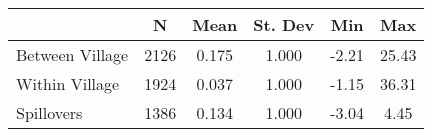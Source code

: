 \begin{tabular}{l*{5}{c}}\hline&\multicolumn{1}{c}{N}&\multicolumn{1}{c}{Mean}&\multicolumn{1}{c}{St. Dev}&\multicolumn{1}{c}{Min}&\multicolumn{1}{c}{Max}\\ \hline 
Between Village & 2126 & 0.175 & 1.000 & -2.21 & 25.43 \\
Within Village & 1924 & 0.037 & 1.000 & -1.15 & 36.31 \\
Spillovers & 1386 & 0.134 & 1.000 & -3.04 & 4.45 \\
\hline \end{tabular}
